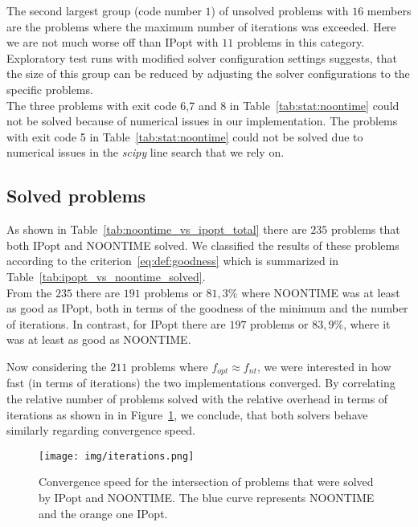 The second largest group (code number $1$) of unsolved problems with $16$ members are the problems where the maximum number of iterations was exceeded. Here we are not much worse off than IPopt with $11$ problems in this category. Exploratory test runs with modified solver configuration settings suggests, that the size of this group can be reduced by adjusting the solver configurations to the specific problems. \\

The three problems with exit code 6,7 and 8 in Table~\ref{tab:stat:noontime} could not be solved because of numerical issues in our implementation.
The problems with exit code 5 in Table~\ref{tab:stat:noontime} could not be solved due to numerical issues in the \textit{scipy} line search that we rely on. \\

\subsection{Solved problems}

As shown in Table~\ref{tab:noontime_vs_ipopt_total} there are $235$ problems that both IPopt and NOONTIME solved. We classified the results of these problems according to the criterion~\eqref{eq:def:goodness} which is summarized in Table~\ref{tab:ipopt_vs_noontime_solved}. \\
From the $235$ there are $191$ problems or $81,3\%$ where NOONTIME was at least as good as IPopt, both in terms of the goodness of the minimum and the number of iterations. In contrast, for IPopt there are $197$ problems or $83,9\%$, where it was at least as good as NOONTIME.

Now considering the $211$ problems where $f_{opt} \approx f_{nt}$, we were interested in how fast (in terms of iterations) the two implementations converged. By correlating the relative number of problems solved with the relative overhead in terms of iterations as shown in in Figure~\ref{fig:iterations}, we conclude, that both solvers behave similarly regarding convergence speed.

\begin{figure}[H]
	\texttt{[image: img/iterations.png]}
	\caption{Convergence speed for the intersection of problems that were solved by IPopt and NOONTIME. The blue curve represents NOONTIME and the orange one IPopt.}
	\label{fig:iterations}
\end{figure}